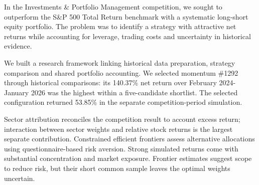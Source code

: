 In the Investments \& Portfolio Management competition, we sought to
outperform the S\&P 500 Total Return benchmark with a systematic long-short
equity portfolio. The problem was to identify a strategy with attractive net
returns while accounting for leverage, trading costs and uncertainty in
historical evidence.

We built a research framework linking historical data preparation, strategy
comparison and shared portfolio accounting. We selected momentum \#1292
through historical comparisons: its 140.37\% net return over
February 2024-January 2026 was the highest within a five-candidate shortlist.
The selected configuration returned 53.85\% in the separate competition-period
simulation.

Sector attribution reconciles the competition result to account excess return;
interaction between sector weights and relative stock returns is the largest
separate contribution. Constrained efficient frontiers assess
alternative allocations using questionnaire-based risk aversion. Strong
simulated returns come with substantial concentration and market exposure.
Frontier estimates suggest scope to reduce risk, but their short common sample
leaves the optimal weights uncertain.
